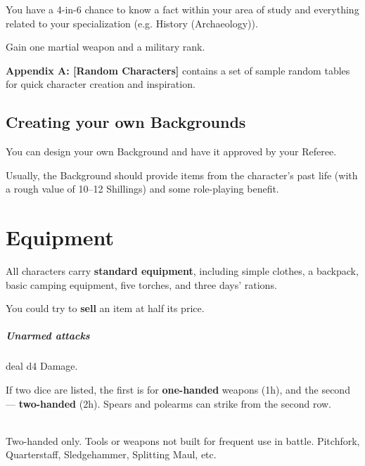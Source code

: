 \documentclass[itdr/core]{subfiles}
\begin{document}
You have a 4-in-6 chance to know a fact within your area of study and everything related to your specialization (e.g. History (Archaeology)).

\vfill
{}
Gain one martial weapon and a military rank.

\vfill
\begin{dbox}
	\textbf{Appendix A: [Random Characters]} contains a set of sample random tables for quick character creation and inspiration.
\end{dbox}

\break

\begin{dbox}
\subsection*{Creating your own Backgrounds}

You can design your own Background and have it approved by your Referee.

Usually, the Background should provide items from the character's past life (with a rough value of 10--12 Shillings) and some role-playing benefit.%
\end{dbox}

\vfill


\vfill
\clearpage


\section{Equipment}

All characters carry \textbf{standard equipment}, including simple clothes, a backpack, basic camping equipment, five torches, and three days' rations.

You could try to \textbf{sell} an item at half its price.

\vfill

\subparagraph{Unarmed attacks} deal d4 Damage.


If two dice are listed, the first is for \textbf{one-handed} weapons (1h), and the second --- \textbf{two-handed} (2h).
Spears and polearms can strike from the second row.

\\
Two-handed only. Tools or weapons not built for frequent use in battle. Pitchfork, Quarterstaff, Sledgehammer, Splitting Maul, etc.
\end{document}
